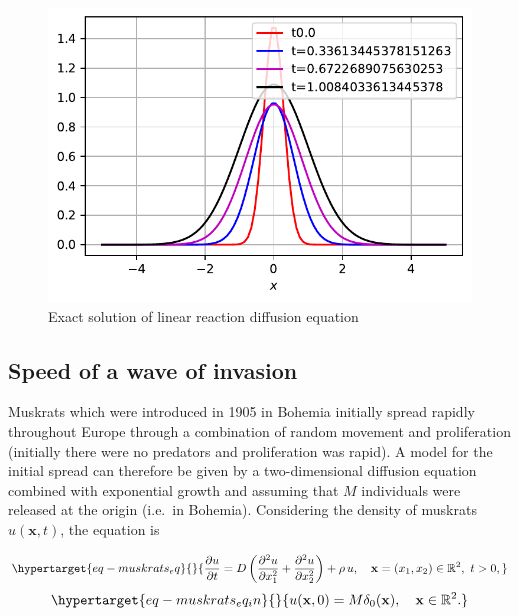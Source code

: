 \documentclass[
  letterpaper,
  DIV=11,
  numbers=noendperiod]{scrreprt}
\theoremstyle{plain}
\theoremstyle{definition}
\theoremstyle{plain}
\theoremstyle{remark}
\begin{document}
\begin{figure}[H]

{\centering \includegraphics{linearreactiondiffusion_files/figure-pdf/fig-diffusionlinearsource-output-3.pdf}

}

\caption{\label{fig-diffusionlinearsource}Exact solution of linear
reaction diffusion equation}

\end{figure}

\hypertarget{speed-of-a-wave-of-invasion}{%
\subsection{Speed of a wave of
invasion}\label{speed-of-a-wave-of-invasion}}

Muskrats which were introduced in 1905 in Bohemia initially spread
rapidly throughout Europe through a combination of random movement and
proliferation (initially there were no predators and proliferation was
rapid). A model for the initial spread can therefore be given by a
two-dimensional diffusion equation combined with exponential growth and
assuming that \(M\) individuals were released at the origin (i.e.~in
Bohemia). Considering the density of muskrats \(u({\mathbf{x}} , t)\),
the equation is

\begin{equation}\protect\hypertarget{eq-muskrats_eq}{}{
\frac{\partial u}{\partial t} = D \left(\frac{\partial^2 u}{\partial x_1^2} +  \frac{\partial^2 u}{\partial x_2^2}\right)  + \rho \, u, \quad {\mathbf{x}} = (x_1 , x_2) \in \mathbb R^2, \, \, t >0, 
}\label{eq-muskrats_eq}\end{equation}
\begin{equation}\protect\hypertarget{eq-muskrats_eq_in}{}{
u({\mathbf{x}}, 0) = M \delta_0({\mathbf{x}}), \quad {\mathbf{x}} \in \mathbb R^2.
}\label{eq-muskrats_eq_in}\end{equation}
\end{document}
